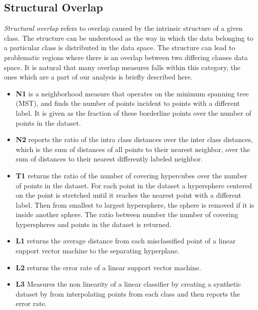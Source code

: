 \subsection{Structural Overlap}
\emph{Structural overlap} refers to overlap caused by the intrinsic structure of a given class. The structure can be understood as the way in which the data belonging to a particular class is distributed in the data space. The structure can lead to problematic regions where there is an overlap between two differing classes data space. It is natural that many overlap measures falls within this category, the ones which are a part of our analysis is briefly described here.

\begin{itemize}
    \item \textbf{N1} is a neighborhood measure that operates on the minimum spanning tree (MST), and finds the number of points incident to points with a different label. It is given as the fraction of these borderline points over the number of points in the dataset. 
    \item \textbf{N2} reports the ratio of the intra class distances over the inter class distances, which is the sum of distances of all points to their nearest neighbor, over the sum of distances to their nearest differently labeled neighbor. 
    \item \textbf{T1} returns the ratio of the number of covering hypercubes over the number of points in the dataset. For each point in the dataset a hypersphere centered on the point is stretched until it reaches the nearest point with a different label. Then from smallest to largest hypersphere, the sphere is removed if it is inside another sphere. The ratio between number the number of covering hyperspheres and points in the dataset is returned.  
    \item \textbf{L1} returns the average distance from each misclassified point of a linear support vector machine to the separating hyperplane.
    \item \textbf{L2} returns the error rate of a linear support vector machine. 
    \item \textbf{L3} Measures the non linearity of a linear classifier by creating a synthetic dataset by from interpolating points from each class and then reports the error rate.
\end{itemize}

